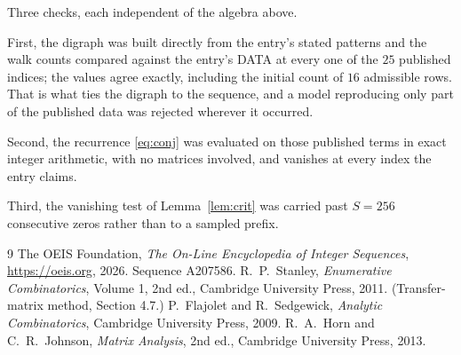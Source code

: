 \documentclass[11pt,a4paper]{article}
\theoremstyle{plain}
\theoremstyle{definition}
\begin{document}
Three checks, each independent of the algebra above.

First, the digraph was built directly from the entry's stated patterns and the walk counts
compared against the entry's DATA at every one of the $25$ published indices; the
values agree exactly, including the initial count of $16$ admissible rows. That is
what ties the digraph to the sequence, and a model reproducing only part of the published
data was rejected wherever it occurred.

Second, the recurrence \eqref{eq:conj} was evaluated on those published terms in exact
integer arithmetic, with no matrices involved, and vanishes at every index the entry claims.

Third, the vanishing test of Lemma~\ref{lem:crit} was carried past $S=256$ consecutive
zeros rather than to a sampled prefix.

\begin{thebibliography}{9}
 The OEIS Foundation, \emph{The On-Line Encyclopedia of Integer
Sequences}, \url{https://oeis.org}, 2026. Sequence A207586.
 R.~P.~Stanley, \emph{Enumerative Combinatorics}, Volume 1, 2nd ed.,
Cambridge University Press, 2011. (Transfer-matrix method, Section 4.7.)
 P.~Flajolet and R.~Sedgewick, \emph{Analytic Combinatorics}, Cambridge
University Press, 2009.
 R.~A.~Horn and C.~R.~Johnson, \emph{Matrix Analysis}, 2nd ed., Cambridge
University Press, 2013.
\end{thebibliography}
\end{document}
